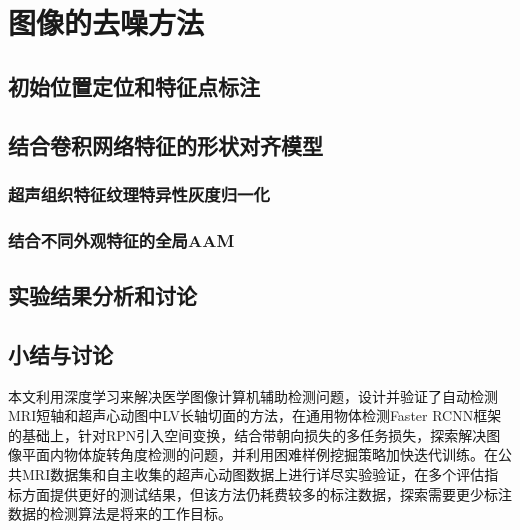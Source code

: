 \chapter{图像的去噪方法}
\label{chap:Segmentation}


\section{初始位置定位和特征点标注}

\section{结合卷积网络特征的形状对齐模型} 
\subsection{超声组织特征纹理特异性灰度归一化}
\subsection{结合不同外观特征的全局AAM}
\section{实验结果分析和讨论}
\section{小结与讨论}

本文利用深度学习来解决医学图像计算机辅助检测问题，设计并验证了自动检测MRI短轴和超声心动图中LV长轴切面的方法，在通用物体检测Faster RCNN框架的基础上，针对RPN引入空间变换，结合带朝向损失的多任务损失，探索解决图像平面内物体旋转角度检测的问题，并利用困难样例挖掘策略加快迭代训练。在公共MRI数据集和自主收集的超声心动图数据上进行详尽实验验证，在多个评估指标方面提供更好的测试结果，但该方法仍耗费较多的标注数据，探索需要更少标注数据的检测算法是将来的工作目标。